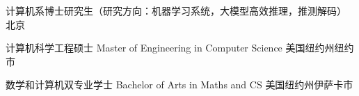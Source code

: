  {}

计算机系博士研究生（研究方向：机器学习系统，大模型高效推理，推测解码） \hfill {北京}

计算机科学工程硕士 \quad Master of Engineering in Computer Science  \hfill {美国纽约州纽约市}



数学和计算机双专业学士 \quad Bachelor of Arts in Maths and CS \hfill {美国纽约州伊萨卡市}



%
%
%
%
%
%
%

